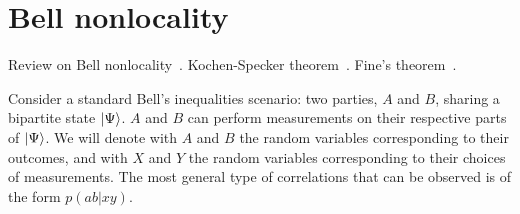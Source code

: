 \documentclass[12pt]{report}
\newcommand{\PP}{\mathbb{P}}
\newcommand{\calE}{{\mathcal{E}}}
\begin{document}

\chapter{Bell nonlocality}

Review on Bell nonlocality~\autocite{brunner2014bell}.
Kochen-Specker theorem~\autocite{kochen1967problem}.
Fine's theorem~\autocite{fine1982joint,fine1982hidden}.

Consider a standard Bell's inequalities scenario: two parties, $A$ and $B$, sharing a bipartite state $\ket\Psi$. $A$ and $B$ can perform measurements on their respective parts of $\ket\Psi$. We will denote with $A$ and $B$ the random variables corresponding to their outcomes, and with $X$ and $Y$ the random variables corresponding to their choices of measurements.
The most general type of correlations that can be observed is of the form $p(ab|xy)$.
\end{document}
